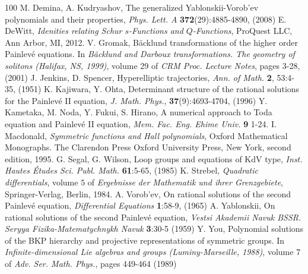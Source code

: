 \documentclass[10pt,reqno,oneside]{amsart}
\numberwithin{equation}{section}
\begin{document}
\begin{thebibliography}{100}
 M. Demina, A. Kudryashov, The generalized Yablonskii-Vorob'ev polynomials and their properties, {\it Phys. Lett. A} {\bf 372}(29):4885-4890, (2008)
 E. DeWitt, {\it Idenities relating Schur $s$-Functions and $Q$-Functions}, ProQuest LLC, Ann Arbor, MI, 2012.
 V. Gromak, B\"acklund transformations of the higher order Painlev\'e equations. In {\it B\"acklund and Darboux transformations. The geometry of solitons (Halifax, NS, 1999)}, volume 29 of {\it CRM Proc. Lecture Notes}, pages 3-28, (2001)
 J. Jenkins, D. Spencer, Hyperelliptic trajectories, {\it Ann. of  Math.} {\bf 2}, 53:4-35, (1951)
 K. Kajiwara, Y. Ohta, Determinant structure of the rational solutions for the Painlev\'e II equation, {\it J. Math. Phys.}, {\bf 37}(9):4693-4704, (1996)
 Y. Kametaka, M. Noda, Y. Fukui, S. Hirano, A numerical approach to Toda equation and Painlev\'e II equation, {\it Mem. Fac. Eng. Ehime Univ.} {\bf 9} 1-24.
 I. Macdonald, {\it Symmetric functions and Hall polynomials}, Oxford Mathematical Monographs. The Clarendon Press Oxford University Press, New York, second edition, 1995.
 G. Segal, G. Wilson, Loop groups and equations of KdV type, {\it Inst. Hautes \'Etudes Sci. Publ. Math.} {\bf 61}:5-65, (1985)
 K. Strebel, {\it Quadratic differentials}, volume $5$ of {\it Ergebnisse der Mathematik und ihrer Grenzgebiete}, Springer-Verlag, Berlin, 1984.
 A. Vorob'ev, On rational solutions of the second Painlev\'e equation, {\it Differential Equations} {\bf 1}:58-9, (1965)
 A. Yablonskii, On rational solutions of the second Painlev\'e equation, {\it Vestsi Akademii Navuk BSSR. Seryya Fizika-Matematychnykh Navuk} {\bf 3}:30-5 (1959)
 Y. You, Polynomial solutions of the BKP hierarchy and projective representations of symmetric groups. In {\it Infinite-dimensional Lie algebras and groups (Luminy-Marseille, 1988)}, volume 7 of {\it Adv. Ser. Math. Phys.}, pages 449-464 (1989)
\end{thebibliography}
\end{document}

